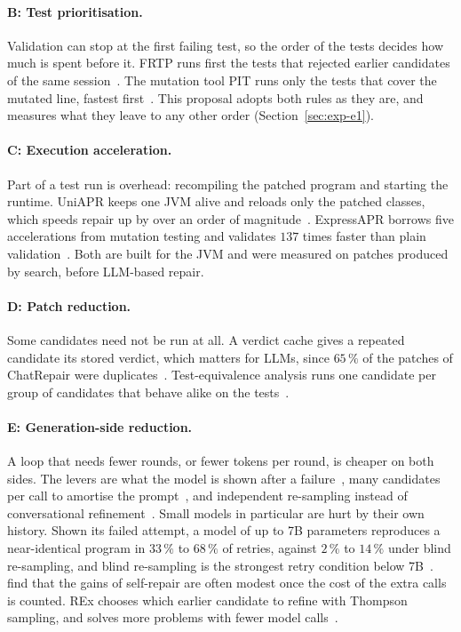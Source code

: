 \paragraph{B: Test prioritisation.} Validation can stop at the first failing
test, so the order of the tests decides how much is spent before it. FRTP runs
first the tests that rejected earlier candidates of the same
session~\citep{qi2013frtp}. The mutation tool PIT runs only the tests that
cover the mutated line, fastest first~\citep{coles2016pit}. This proposal
adopts both rules as they are, and measures what they leave to any other order
(Section~\ref{sec:exp-e1}).

\paragraph{C: Execution acceleration.} Part of a test run is overhead:
recompiling the patched program and starting the runtime. UniAPR keeps one JVM
alive and reloads only the patched classes, which speeds repair up by over an
order of magnitude~\citep{chen2021uniapr}. ExpressAPR borrows five
accelerations from mutation testing and validates $137$ times faster than
plain validation~\citep{xiao2024expressapr}. Both are built for the JVM and
were measured on patches produced by search, before LLM-based repair.

\paragraph{D: Patch reduction.} Some candidates need not be run at all. A
verdict cache gives a repeated candidate its stored verdict, which matters for
LLMs, since $65\,\%$ of the patches of ChatRepair were
duplicates~\citep{chen2025conversational}. Test-equivalence analysis runs one
candidate per group of candidates that behave alike on the
tests~\citep{mechtaev2018testequivalence}.

\paragraph{E: Generation-side reduction.} A loop that needs fewer rounds, or
fewer tokens per round, is cheaper on both sides. The levers are what the
model is shown after a failure~\citep{xia2024chatrepair}, many candidates per
call to amortise the prompt~\citep{hidvegi2024cigar}, and independent
re-sampling instead of conversational
refinement~\citep{chen2025conversational}. Small models in particular are hurt
by their own history. Shown its failed attempt, a model of up to 7B parameters
reproduces a near-identical program in $33\,\%$ to $68\,\%$ of retries, against
$2\,\%$ to $14\,\%$ under blind re-sampling, and blind re-sampling is the
strongest retry condition below 7B~\citep{verma2026blind}.
\citet{olausson2024selfrepair} find that the gains of self-repair are often
modest once the cost of the extra calls is counted. REx chooses which earlier
candidate to refine with Thompson sampling, and solves more problems with
fewer model calls~\citep{tang2024rex}.

